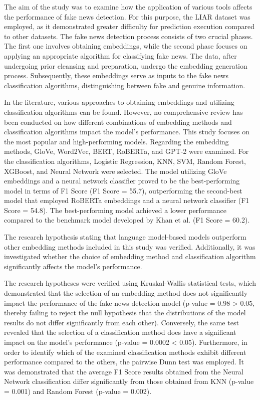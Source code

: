 The aim of the study was to examine how the application of various tools affects the performance of fake news detection. For this purpose, the LIAR dataset was employed, as it demonstrated greater difficulty for prediction execution compared to other datasets. The fake news detection process consists of two crucial phases. The first one involves obtaining embeddings, while the second phase focuses on applying an appropriate algorithm for classifying fake news. The data, after undergoing prior cleansing and preparation, undergo the embedding generation process. Subsequently, these embeddings serve as inputs to the fake news classification algorithms, distinguishing between fake and genuine information.

In the literature, various approaches to obtaining embeddings and utilizing classification algorithms can be found. However, no comprehensive review has been conducted on how different combinations of embedding methods and classification algorithms impact the model's performance. This study focuses on the most popular and high-performing models. Regarding the embedding methods, GloVe, Word2Vec, BERT, RoBERTa, and GPT-2 were examined. For the classification algorithms, Logistic Regression, KNN, SVM, Random Forest, XGBoost, and Neural Network were selected. The model utilizing GloVe embeddings and a neural network classifier proved to be the best-performing model in terms of F1 Score (F1 Score = 55.7), outperforming the second-best model that employed RoBERTa embeddings and a neural network classifier (F1 Score = 54.8). The best-performing model achieved a lower performance compared to the benchmark model developed by Khan et al. (F1 Score = 60.2).

The research hypothesis stating that language model-based models outperform other embedding methods included in this study was verified. Additionally, it was investigated whether the choice of embedding method and classification algorithm significantly affects the model's performance.


The research hypotheses were verified using Kruskal-Wallis statistical tests, which demonstrated that the selection of an embedding method does not significantly impact the performance of the fake news detection model (p-value = 0.98 > 0.05, thereby failing to reject the null hypothesis that the distributions of the model results do not differ significantly from each other). Conversely, the same test revealed that the selection of a classification method does have a significant impact on the model's performance (p-value = 0.0002 < 0.05). Furthermore, in order to identify which of the examined classification methods exhibit different performance compared to the others, the pairwise Dunn test was employed. It was demonstrated that the average F1 Score results obtained from the Neural Network classification differ significantly from those obtained from KNN (p-value = 0.001) and Random Forest (p-value = 0.002).


